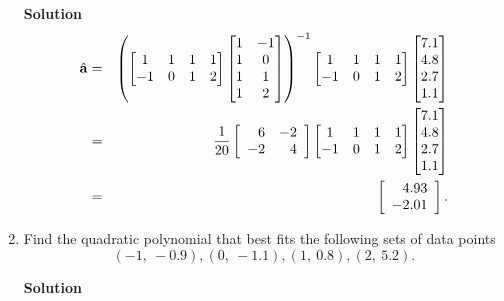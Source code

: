 \begin{enumerate}
\noindent \textbf{Solution}
\begin{eqnarray*}
\hat{\bf{a}} &=& \left( \begin{bmatrix} 1 & 1 & 1 & 1 \\ -1 & 0 &
1 & 2 \end{bmatrix}
\begin{bmatrix} 1 & -1\\1 & 0\\1& 1\\1 & 2\end{bmatrix}\right)^{-1}
\begin{bmatrix} 1 & 1 & 1 & 1 \\ -1 & 0 & 1 & 2 \end{bmatrix}
\begin{bmatrix} 7.1 \\ 4.8 \\ 2.7 \\ 1.1 \end{bmatrix}\\
&=&\frac{1}{20} \left[ \begin{array}{rr} 6 & -2 \\-2 & 4
\end{array} \right]
\begin{bmatrix}1 & 1 & 1 & 1\\-1 & 0 & 1 & 2 \end{bmatrix}
\begin{bmatrix} 7.1 \\ 4.8 \\ 2.7 \\ 1.1 \end{bmatrix} \\
&=& \left[ \begin{array}{r}4.93 \\ -2.01 \end{array} \right].
\end{eqnarray*}

\item Find the quadratic polynomial that best fits the following sets of data points
$$
(-1,\ -0.9), (0,\ -1.1), (1,\ 0.8), (2,\ 5.2).
$$

\noindent \textbf{Solution}


\end{enumerate}
